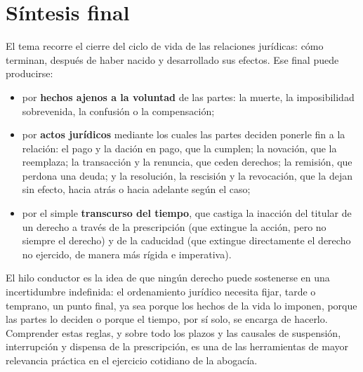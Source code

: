 \documentclass[12pt,oneside]{book}
\begin{document}
\chapter[Síntesis final]{Síntesis final}

El tema recorre el cierre del ciclo de vida de las relaciones jurídicas: cómo terminan, después de haber nacido y desarrollado sus efectos. Ese final puede producirse:

\begin{itemize}
    \item por \textbf{hechos ajenos a la voluntad} de las partes: la muerte, la imposibilidad sobrevenida, la confusión o la compensación;
    \item por \textbf{actos jurídicos} mediante los cuales las partes deciden ponerle fin a la relación: el pago y la dación en pago, que la cumplen; la novación, que la reemplaza; la transacción y la renuncia, que ceden derechos; la remisión, que perdona una deuda; y la resolución, la rescisión y la revocación, que la dejan sin efecto, hacia atrás o hacia adelante según el caso;
    \item por el simple \textbf{transcurso del tiempo}, que castiga la inacción del titular de un derecho a través de la prescripción (que extingue la acción, pero no siempre el derecho) y de la caducidad (que extingue directamente el derecho no ejercido, de manera más rígida e imperativa).
\end{itemize}

El hilo conductor es la idea de que ningún derecho puede sostenerse en una incertidumbre indefinida: el ordenamiento jurídico necesita fijar, tarde o temprano, un punto final, ya sea porque los hechos de la vida lo imponen, porque las partes lo deciden o porque el tiempo, por sí solo, se encarga de hacerlo. Comprender estas reglas, y sobre todo los plazos y las causales de suspensión, interrupción y dispensa de la prescripción, es una de las herramientas de mayor relevancia práctica en el ejercicio cotidiano de la abogacía.
\end{document}
